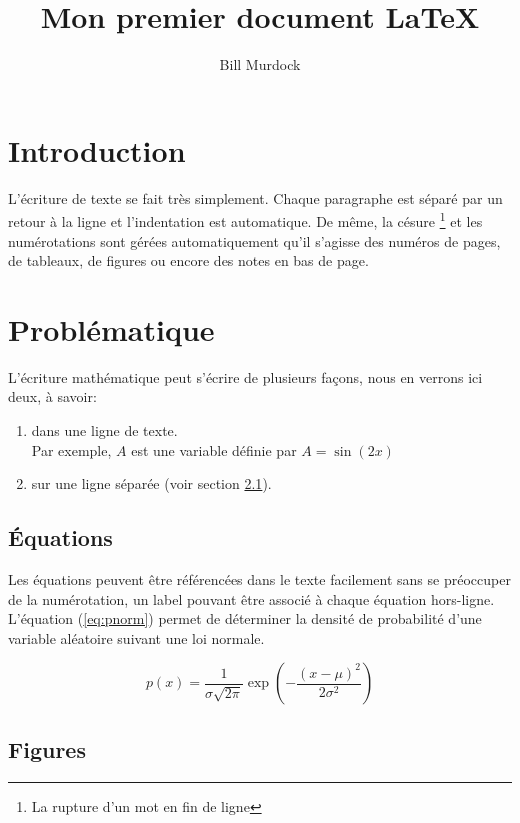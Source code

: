 \documentclass[12pt]{article} %
\author{Bill Murdock}
\title{Mon premier document \LaTeX}
\begin{document}
\maketitle

\tableofcontents
\newpage

\section{Introduction}
L'écriture de texte se fait très simplement. Chaque paragraphe est séparé par un retour à la ligne et l'indentation est automatique. De même, la césure \footnote{La rupture d'un mot en fin de ligne} et les numérotations sont gérées automatiquement qu'il s'agisse des numéros de pages, de tableaux, de figures ou encore des notes en bas de page.

\section{Problématique}

L'écriture mathématique peut s'écrire de plusieurs façons, nous en verrons ici deux, à savoir:
\begin{enumerate}
 	\item dans une ligne de texte.\\Par exemple, $A$ est une variable définie par $A=\sin(2x)$
 	\item sur une ligne séparée (voir section \ref{eq}).
 \end{enumerate}

\subsection{Équations}\label{eq}

Les équations peuvent être référencées dans le texte facilement sans se préoccuper de la numérotation, un label pouvant être associé à chaque équation hors-ligne. L'équation (\ref{eq:pnorm}) permet de déterminer la densité de probabilité d'une variable aléatoire suivant une loi normale.

\begin{equation} \label{eq:pnorm}
	p(x)=\frac{1}{\sigma \sqrt{2\pi}} \exp \left(-\frac{(x-\mu)^2}{2\sigma^2}\right)
\end{equation}

\subsection{Figures}
\end{document}

